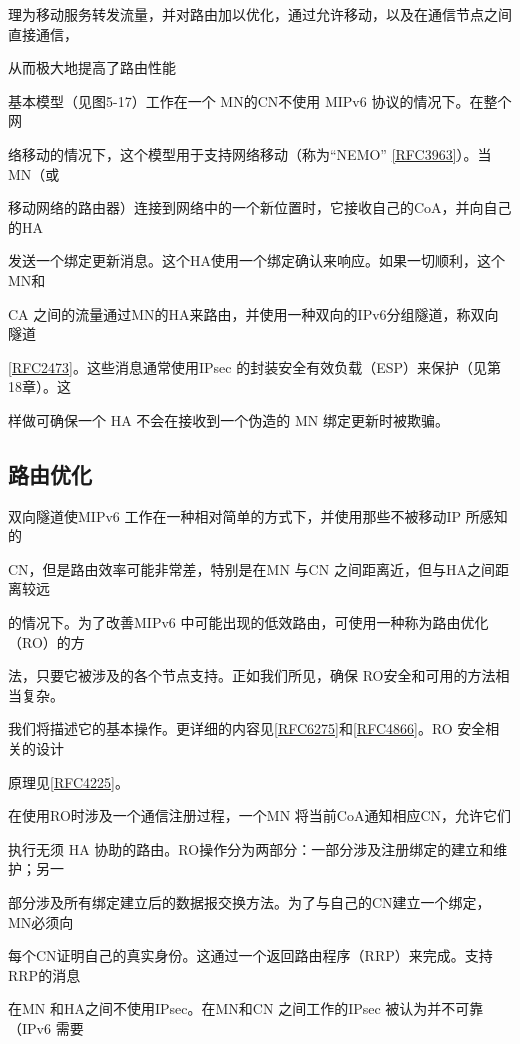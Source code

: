 理为移动服务转发流量，并对路由加以优化，通过允许移动，以及在通信节点之间直接通信，

从而极大地提高了路由性能

基本模型（见图5-17）工作在一个 MN的CN不使用 MIPv6 协议的情况下。在整个网

络移动的情况下，这个模型用于支持网络移动（称为“NEMO” \href{https://www.rfc-editor.org/rfc/rfc3963}{[RFC3963]}）。当MN（或

移动网络的路由器）连接到网络中的一个新位置时，它接收自己的CoA，并向自己的HA

发送一个绑定更新消息。这个HA使用一个绑定确认来响应。如果一切顺利，这个MN和

CA 之间的流量通过MN的HA来路由，并使用一种双向的IPv6分组隧道，称双向隧道

\href{https://www.rfc-editor.org/rfc/rfc2473}{[RFC2473]}。这些消息通常使用IPsec 的封装安全有效负载（ESP）来保护（见第18章）。这

样做可确保一个 HA 不会在接收到一个伪造的 MN 绑定更新时被欺骗。

\subsection{路由优化}
双向隧道使MIPv6 工作在一种相对简单的方式下，并使用那些不被移动IP 所感知的

CN，但是路由效率可能非常差，特别是在MN 与CN 之间距离近，但与HA之间距离较远

的情况下。为了改善MIPv6 中可能出现的低效路由，可使用一种称为路由优化（RO）的方

法，只要它被涉及的各个节点支持。正如我们所见，确保 RO安全和可用的方法相当复杂。

我们将描述它的基本操作。更详细的内容见\href{https://www.rfc-editor.org/rfc/rfc6275}{[RFC6275]}和\href{https://www.rfc-editor.org/rfc/rfc4866}{[RFC4866]}。RO 安全相关的设计

原理见\href{https://www.rfc-editor.org/rfc/rfc4225}{[RFC4225]}。

在使用RO时涉及一个通信注册过程，一个MN 将当前CoA通知相应CN，允许它们

执行无须 HA 协助的路由。RO操作分为两部分：一部分涉及注册绑定的建立和维护；另一

部分涉及所有绑定建立后的数据报交换方法。为了与自己的CN建立一个绑定，MN必须向

每个CN证明自己的真实身份。这通过一个返回路由程序（RRP）来完成。支持RRP的消息

在MN 和HA之间不使用IPsec。在MN和CN 之间工作的IPsec 被认为并不可靠（IPv6 需要

